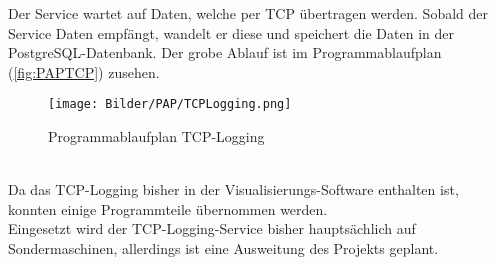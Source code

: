 Der Service wartet auf Daten, welche per TCP übertragen werden. Sobald der Service Daten empfängt, wandelt er diese und speichert die Daten in der PostgreSQL-Datenbank. Der grobe Ablauf ist im Programmablaufplan (\autoref{fig:PAPTCP}) zusehen. 
\begin{figure}
\centering
 \texttt{[image: Bilder/PAP/TCPLogging.png]}
 \caption[Programmablaufplan TCP-Logging]{Programmablaufplan TCP-Logging}
 \label{fig:PAPTCP}
\end{figure}
\ \\ 
Da das TCP-Logging bisher in der Visualisierungs-Software enthalten ist, konnten einige Programmteile übernommen werden. 
\ \\
Eingesetzt wird der TCP-Logging-Service bisher hauptsächlich auf Sondermaschinen, allerdings ist eine Ausweitung des Projekts geplant.
